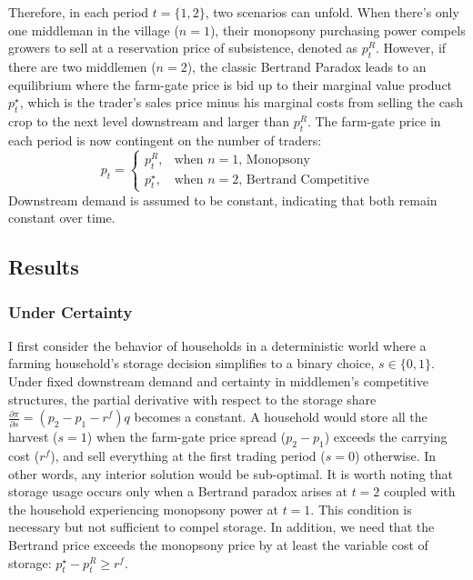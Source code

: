 Therefore, in each period $t=\{1,2\}$, two scenarios can unfold. When there's only one middleman in the village ($n=1$), their monopsony purchasing power compels growers to sell at a reservation price of subsistence, denoted as $p^R_t$. However, if there are two middlemen ($n=2$), the classic Bertrand Paradox leads to an equilibrium where the farm-gate price is bid up to their marginal value product $p^\star_t$, which is the trader's sales price minus his marginal costs from selling the cash crop to the next level downstream and larger than $p^R_t$. The farm-gate price in each period is now contingent on the number of traders:
\begin{equation}
p_t=
        \begin{cases}
            p^R_t, & \text {when $n=1$, Monopsony} \\ 
            p^{\star}_t, & \text {when $n=2$, Bertrand Competitive}
        \end{cases}
\end{equation}
Downstream demand is assumed to be constant, indicating that both remain constant over time.


\subsection{Results}

\subsubsection{Under Certainty}
\noindent I first consider the behavior of households in a deterministic world where a farming household's storage decision simplifies to a binary choice, $s \in \{0,1\}$. Under fixed downstream demand and certainty in middlemen's competitive structures, the partial derivative with respect to the storage share $\frac{\partial \pi}{\partial s}=(p_2-p_1-r^f)q$ becomes a constant. A household would store all the harvest ($s=1$) when the farm-gate price spread ($p_2-p_1$) exceeds the carrying cost ($r^f$), and sell everything at the first trading period ($s=0$) otherwise. In other words, any interior solution would be sub-optimal. It is worth noting that storage usage occurs only when a Bertrand paradox arises at $t=2$ coupled with the household experiencing monopsony power at $t=1$. This condition is necessary but not sufficient to compel storage. In addition, we need that the Bertrand price exceeds the monopsony price by at least the variable cost of storage: $p^\star_t - p^R_t \geq r^f$. 

